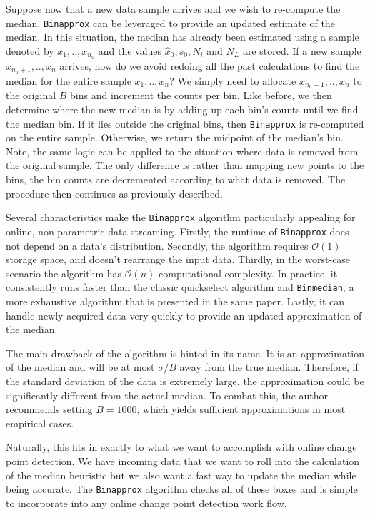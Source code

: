 Suppose now that a new data sample arrives and we wish to re-compute the median. \texttt{Binapprox} can be leveraged to provide an updated estimate of the median. In this situation, the median has already been estimated using a sample denoted by $x_1,..,x_{n_0}$ and the values $\hat{x}_0, s_0, N_i$ and  $N_L$ are stored. If a new sample $x_{n_0+1},..,x_{n}$ arrives, how do we avoid redoing all the past calculations to find the median for the entire sample $x_1,..,x_n$? We simply need to allocate $x_{n_0+1},..,x_{n}$  to the original $B$ bins and increment the counts per bin. Like before, we then determine where the new median is by adding up each bin's counts until we find the median bin. If it lies outside the original bins, then \texttt{Binapprox} is re-computed on the entire sample. Otherwise, we return the midpoint of the median's bin. Note, the same logic can be applied to the situation where data is removed from the original sample. The only difference is rather than mapping new points to the bins, the bin counts are decremented according to what data is removed. The procedure then continues as previously described.

Several characteristics make the \texttt{Binapprox} algorithm particularly appealing for online, non-parametric data streaming.  Firstly, the runtime of \texttt{Binapprox} does not depend on a data's distribution. Secondly, the algorithm requires $\mathcal{O}(1)$ storage space, and doesn't rearrange the input data. Thirdly, in the worst-case scenario the algorithm has $\mathcal{O}(n)$ computational complexity. In practice, it consistently runs faster than the classic quickselect algorithm and \texttt{Binmedian}, a more exhaustive  algorithm that is presented in the same paper. Lastly, it can handle newly acquired data very quickly to provide an updated approximation of the median. 

The main drawback of the algorithm is hinted in its name. It is an approximation of the median and will be at most $\sigma / B$ away from the true median. Therefore, if the standard deviation of the data is extremely large,
the approximation could be significantly different from the actual median. To combat this, the author recommends setting $B=1000$, which yields sufficient approximations in most empirical cases.

Naturally, this fits in exactly to what we want to accomplish with online change point detection. We have incoming data that we want to roll into the calculation of the median heuristic but we also want a fast way to update the median while being accurate. The \texttt{Binapprox} algorithm checks all of these boxes and is simple to incorporate into any online change point detection work flow. 

